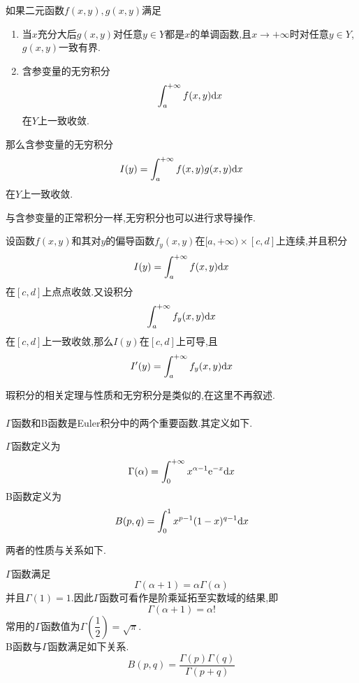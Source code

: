 \documentclass{ctexart}
\begin{document}
\begin{formal}[1.5 Abel判别法]
    如果二元函数$f(x,y),g(x,y)$满足
    \begin{enumerate}[topsep=0pt,parsep=0pt,itemsep=0pt,partopsep=0pt,leftmargin=*,label=\tbf{(\arabic*)}]
        \item 当$x$充分大后$g(x,y)$对任意$y\in Y$都是$x$的单调函数,且$x\to+\infty$时对任意$y\in Y$,$g(x,y)$一致有界.
        \item 含参变量的无穷积分
            \[\int_a^{+\infty}f(x,y)\mathrm{d} x\]
            在$Y$上一致收敛.
    \end{enumerate}
    那么含参变量的无穷积分
    \[I(y)=\int_a^{+\infty}f(x,y)g(x,y)\mathrm{d} x\]
    在$Y$上一致收敛.
\end{formal}
与含参变量的正常积分一样,无穷积分也可以进行求导操作.
\begin{formal}[1.6 含参变量无穷积分的可微性]
    设函数$f(x,y)$和其对$y$的偏导函数$f_y(x,y)$在$[a,+\infty)\times[c,d]$上连续,并且积分
    \[I(y)=\int_a^{+\infty}f(x,y)\mathrm{d} x\]
    在$[c,d]$上点点收敛.又设积分
    \[\int_a^{+\infty}f_y(x,y)\mathrm{d} x\]
    在$[c,d]$上一致收敛,那么$I(y)$在$[c,d]$上可导,且
    \[I'(y)=\int_a^{+\infty}f_y(x,y)\mathrm{d} x\]

\end{formal}
瑕积分的相关定理与性质和无穷积分是类似的,在这里不再叙述.\\
\\
\indent $\Gamma$函数和B函数是Euler积分中的两个重要函数.其定义如下.
\begin{definition}
    $\Gamma$函数定义为
    \[\Gamma(\alpha)=\int_0^{+\infty}x^{\alpha-1}\mathrm{e}^{-x}\mathrm{d} x\]
    B函数定义为
    \[B(p,q)=\int_0^1x^{p-1}(1-x)^{q-1}\mathrm{d} x\]

\end{definition}
两者的性质与关系如下.
\begin{formal}
    $\Gamma$函数满足
    \[\Gamma(\alpha+1)=\alpha\Gamma(\alpha)\]
    并且$\Gamma(1)=1$.因此$\Gamma$函数可看作是阶乘延拓至实数域的结果,即
    \[\Gamma(\alpha+1)=\alpha!\]
    常用的$\Gamma$函数值为$\Gamma\left(\dfrac12\right)=\sqrt{\pi}$.\\
    B函数与$\Gamma$函数满足如下关系.
    \[B(p,q)=\dfrac{\Gamma(p)\Gamma(q)}{\Gamma(p+q)}\]
    
\end{formal}
\end{document}
